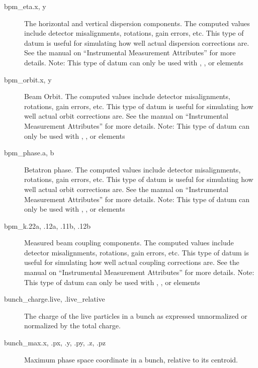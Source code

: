 \begin{description}
  \item[bpm_eta.x, y] \Newline {}
The horizontal and vertical dispersion components. The computed  values include detector
misalignments, rotations, gain errors, etc. This type of datum is useful for simulating how well
actual dispersion corrections are. See the \bmad manual on ``Instrumental Measurement Attributes''
for more details.  Note: This type of datum can only be used with , ,
 or  elements

  \item[bpm_orbit.x, y] \Newline {}
Beam Orbit. The computed  values include detector misalignments, rotations, gain errors,
etc. This type of datum is useful for simulating how well actual orbit corrections are. See the
\bmad manual on ``Instrumental Measurement Attributes'' for more details.  Note: This type of datum
can only be used with , ,  or  elements

  \item[bpm_phase.a, b] \Newline {}
Betatron phase. The computed  values include detector misalignments, rotations, gain
errors, etc. This type of datum is useful for simulating how well actual orbit corrections are. See
the \bmad manual on ``Instrumental Measurement Attributes'' for more details.  Note: This type of
datum can only be used with , ,  or  elements

  \item[bpm_k.22a, .12a, .11b, .12b] \Newline {}
Measured beam coupling components. The computed  values include detector misalignments,
rotations, gain errors, etc. This type of datum is useful for simulating how well actual coupling
corrections are. See the \bmad manual on ``Instrumental Measurement Attributes'' for more details.
Note: This type of datum can only be used with , ,  or
 elements

  \item[bunch_charge.live, .live_relative] \Newline {}
The charge of the live particles in a bunch as expressed unnormalized or normalized by the total charge.

  \item[bunch_max.x, .px, .y, .py, .z, .pz] \Newline {}
Maximum phase space coordinate in a bunch, relative to its centroid.


\end{description}
